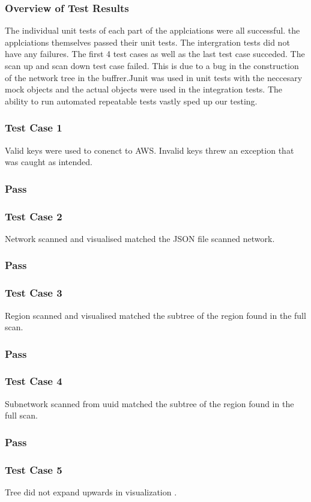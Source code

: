 \documentclass[hidelinks,a4paper,12pt]{article}
\begin{document}
\subsubsection{Overview of Test Results}
The individual unit tests of each part of the applciations were all successful. the applciations themselves passed their unit tests. The intergration tests did not have any failures. The first 4  test cases as well as the last test case succeded. The scan up and scan down test case failed. This is due to a bug in the construction of the network tree in the buffrer.Junit was used in unit tests with the neccesary mock objects and the actual objects were used in the integration tests. The ability to run automated repeatable tests vastly sped up our testing.
\subsubsection{Test Case 1}
Valid keys were used to conenct to AWS. Invalid keys threw an exception that was caught as intended.
\subsubsection{Pass}
\subsubsection{Test Case 2}
Network scanned and visualised matched the JSON file scanned network.
\subsubsection{Pass}
\subsubsection{Test Case 3}
Region scanned and visualised matched the subtree of the region found in the full scan.
\subsubsection{Pass}
\subsubsection{Test Case 4}
Subnetwork scanned from uuid matched the subtree of the region found in the full scan.
\subsubsection{Pass}
\subsubsection{Test Case 5}
Tree did not expand upwards in visualization .
\end{document}
